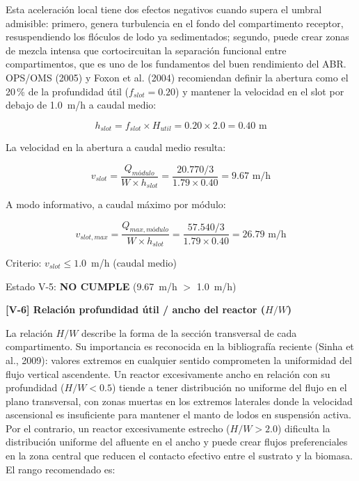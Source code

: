\documentclass[12pt,a4paper]{article}
\begin{document}
Esta aceleración local tiene dos efectos negativos cuando supera el umbral admisible: primero, genera turbulencia en el fondo del compartimento receptor, resuspendiendo los flóculos de lodo ya sedimentados; segundo, puede crear zonas de mezcla intensa que cortocircuitan la separación funcional entre compartimentos, que es uno de los fundamentos del buen rendimiento del ABR. OPS/OMS (2005) y Foxon et al. (2004) recomiendan definir la abertura como el 20\,\% de la profundidad útil ($f_{slot} = 0.20$) y mantener la velocidad en el slot por debajo de 1.0~m/h a caudal medio:

\begin{equation}
h_{slot} = f_{slot} \times H_{util} = 0.20 \times 2.0 = 0.40 \text{ m}
\end{equation}

La velocidad en la abertura a caudal medio resulta:

\begin{equation}
v_{slot} = \frac{Q_{módulo}}{W \times h_{slot}} = \frac{20.770 / 3}{1.79 \times 0.40} = 9.67 \text{ m/h}
\end{equation}

A modo informativo, a caudal máximo por módulo:

\begin{equation}
v_{slot,max} = \frac{Q_{max,módulo}}{W \times h_{slot}} = \frac{57.540 / 3}{1.79 \times 0.40} = 26.79 \text{ m/h}
\end{equation}

Criterio: $v_{slot} \leq 1.0$~m/h (caudal medio)

Estado V-5: \textbf{NO CUMPLE} (9.67~m/h $>$ 1.0~m/h)

\textbf{[V-6] Relación profundidad útil / ancho del reactor ($H/W$)}

La relación $H/W$ describe la forma de la sección transversal de cada compartimento. Su importancia es reconocida en la bibliografía reciente (Sinha et al., 2009): valores extremos en cualquier sentido comprometen la uniformidad del flujo vertical ascendente. Un reactor excesivamente ancho en relación con su profundidad ($H/W < 0.5$) tiende a tener distribución no uniforme del flujo en el plano transversal, con zonas muertas en los extremos laterales donde la velocidad ascensional es insuficiente para mantener el manto de lodos en suspensión activa. Por el contrario, un reactor excesivamente estrecho ($H/W > 2.0$) dificulta la distribución uniforme del afluente en el ancho y puede crear flujos preferenciales en la zona central que reducen el contacto efectivo entre el sustrato y la biomasa. El rango recomendado es:
\end{document}
